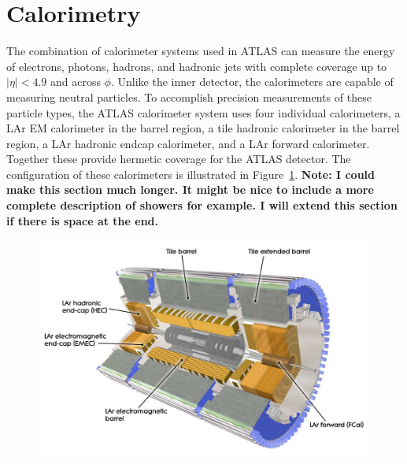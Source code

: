 
\section{Calorimetry}
\label{sec:calorimetry}

The combination of calorimeter systems used in ATLAS can measure the energy of electrons, photons, hadrons, and hadronic jets with complete coverage up to $|\eta| < 4.9$ and across $\phi$.
Unlike the inner detector, the calorimeters are capable of measuring neutral particles.
To accomplish precision measurements of these particle types, the ATLAS calorimeter system uses four individual calorimeters, a \ac{LAr} \acl{EM} calorimeter in the barrel region, a tile hadronic calorimeter in the barrel region, a \ac{LAr} hadronic endcap calorimeter, and a \ac{LAr} forward calorimeter.
Together these provide hermetic coverage for the ATLAS detector.
The configuration of these calorimeters is illustrated in Figure~\ref{fig:calo_overview}. 
\textbf{Note: I could make this section much longer. It might be nice to include a more complete description of showers for example. I will extend this section if there is space at the end.}

\begin{figure}[hbtp]
\includegraphics[width=\fullfig]{figures/calo_overview.pdf}
\caption{}
\label{fig:calo_overview}
\end{figure}

